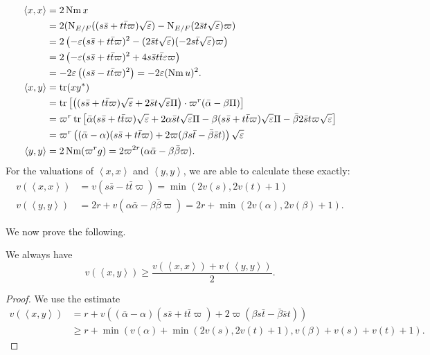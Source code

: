 \begin{align*}
  \left\langle x,x \right\rangle &= 2 \operatorname{Nm} x \\
  &= 2 (\operatorname{N}_{E/F}((s \bar s + t \bar t \varpi)\sqrt{\varepsilon})
    - \operatorname{N}_{E/F}(2 \bar s t \sqrt{\varepsilon}) \varpi) \\
  &= 2\left( -\varepsilon(s \bar s + t \bar t \varpi)^2
    - (2\bar s t \sqrt{\varepsilon})(-2s \bar t \sqrt{\varepsilon}) \varpi \right) \\
  &= 2\left( -\varepsilon(s \bar s + t \bar t \varpi)^2
    + 4s\bar s t \bar t \varepsilon \varpi \right) \\
  &= -2\varepsilon\left( (s \bar s - t \bar t \varpi)^2 \right) = -2\varepsilon (\operatorname{Nm} u)^2. \\
  \left\langle x,y \right\rangle &= \operatorname{tr}(x y^\ast) \\
  &= \operatorname{tr} \left[
    \left( (s \bar s + t \bar t \varpi) \sqrt{\varepsilon} + 2 \bar s t \sqrt{\varepsilon} \Pi \right)
    \cdot \varpi^{r} (\bar\alpha - \beta \Pi)
  \right] \\
  &= \varpi^r \operatorname{tr} \left[
    \bar\alpha (s \bar s + t \bar t \varpi) \sqrt{\varepsilon}
    + 2 \alpha \bar s t \sqrt{\varepsilon} \Pi
    - \beta (s \bar s + t \bar t \varpi) \sqrt{\varepsilon} \Pi
    - \bar\beta 2 \bar s t \varpi \sqrt{\varepsilon}
  \right] \\
  &= \varpi^r \left(
    (\bar\alpha - \alpha)(s \bar s + t \bar t \varpi)
    + 2\varpi(\beta s \bar t - \bar\beta \bar s t)
  \right) \sqrt{\varepsilon} \\
  \left\langle y,y \right\rangle &= 2 \operatorname{Nm} (\varpi^r g)
  = 2\varpi^{2r} (\alpha \bar\alpha - \beta\bar\beta \varpi).
\end{align*}
For the valuations of $\left\langle x,x \right\rangle$ and $\left\langle y,y \right\rangle$,
we are able to calculate these exactly:
\begin{align*}
  v(\left\langle x,x \right\rangle)
  &= v\left( s \bar s - t \bar t \varpi \right)
  = \min\left( 2v(s), 2v(t) +1 \right) \\
  v\left( \left\langle y,y \right\rangle \right)
  &= 2r + v\left( \alpha \bar \alpha - \beta \bar \beta \varpi \right)
  = 2r + \min\left( 2v(\alpha), 2v(\beta) + 1 \right).
\end{align*}

We now prove the following.
\begin{lemma}
  We always have
  \[
    v\left( \left\langle x,y \right\rangle \right) \ge
    \frac{v\left( \left\langle x,x \right\rangle \right)
      + v\left( \left\langle y,y \right\rangle \right)}{2}.
  \]
\end{lemma}
\begin{proof}
  We use the estimate
  \begin{align*}
    v\left( \left\langle x,y \right\rangle  \right)
    &= r + v\left(
      (\bar\alpha - \alpha)(s \bar s + t \bar t \varpi)
      + 2\varpi(\beta s \bar t - \bar\beta \bar s t) \right) \\
    &\ge r + \min(
      v(\alpha) + \min(2v(s), 2v(t)+1),
      v(\beta) + v(s) + v(t) + 1
    ).
  \end{align*}
\end{proof}

